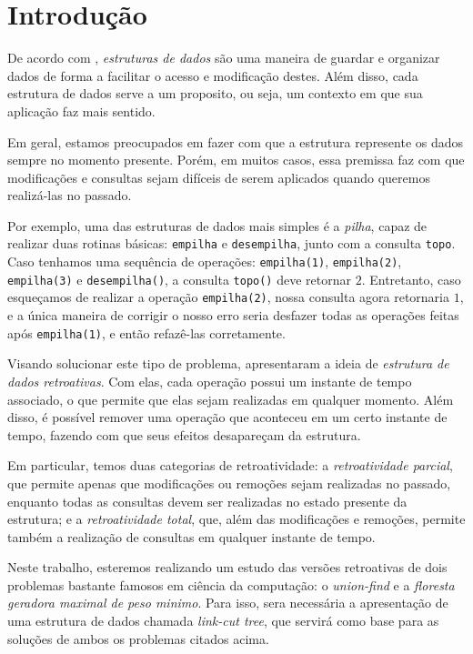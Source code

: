 
\chapter{Introdução}
\label{cap:introducao}

De acordo com \citet{10.5555/1614191}, \emph{estruturas de dados} são uma maneira de guardar e organizar dados de forma a facilitar o acesso e modificação destes. Além disso, cada estrutura de dados serve a um proposito, ou seja, um contexto em que sua aplicação faz mais sentido.

Em geral, estamos preocupados em fazer com que a estrutura represente os dados sempre no momento presente. Porém, em muitos casos, essa premissa faz com que modificações e consultas sejam difíceis de serem aplicados quando queremos realizá-las no passado.

Por exemplo, uma das estruturas de dados mais simples é a \emph{pilha}, capaz de realizar duas rotinas básicas: \texttt{empilha} e \texttt{desempilha}, junto com a consulta \texttt{topo}. Caso tenhamos uma sequência de operações: \texttt{empilha(1)}, \texttt{empilha(2)}, \texttt{empilha(3)} e \texttt{desempilha()}, a consulta \texttt{topo()} deve retornar $2$. Entretanto, caso esqueçamos de realizar a operação \texttt{empilha(2)}, nossa consulta agora retornaria $1$, e a única maneira de corrigir o nosso erro seria desfazer todas as operações feitas após \texttt{empilha(1)}, e então refazê-las corretamente.

Visando solucionar este tipo de problema, \citet{10.1145/1240233.1240236} apresentaram a ideia de \emph{estrutura de dados retroativas}. Com elas, cada operação possui um instante de tempo associado, o que permite que elas sejam realizadas em qualquer momento. Além disso, é possível remover uma operação que aconteceu em um certo instante de tempo, fazendo com que seus efeitos desapareçam da estrutura.

Em particular, temos duas categorias de retroatividade: a \emph{retroatividade parcial}, que permite apenas que modificações ou remoções sejam realizadas no passado, enquanto todas as consultas devem ser realizadas no estado presente da estrutura; e a \emph{retroatividade total}, que, além das modificações e remoções, permite também a realização de consultas em qualquer instante de tempo.

Neste trabalho, esteremos realizando um estudo das versões retroativas de dois problemas bastante famosos em ciência da computação: o \emph{union-find} e a \emph{floresta geradora maximal de peso minimo}. Para isso, sera necessária a apresentação de uma estrutura de dados chamada \emph{link-cut tree}, que servirá como base para as soluções de ambos os problemas citados acima.

